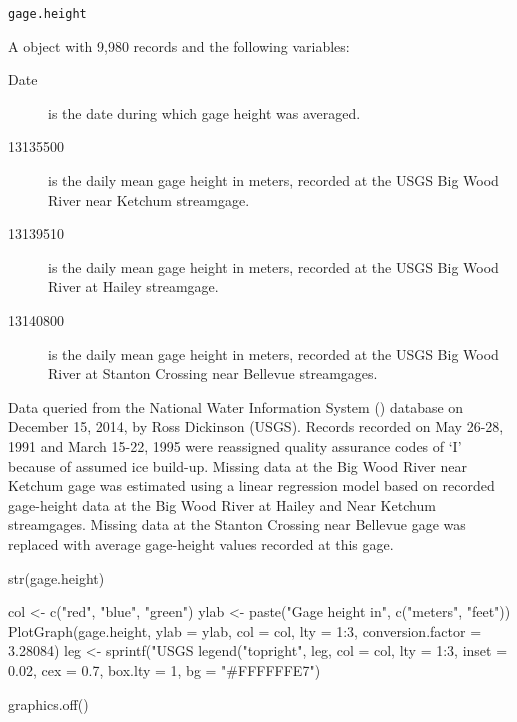 \documentclass[a4paper]{book}
\begin{document}
%
\begin{Usage}
\begin{verbatim}
gage.height
\end{verbatim}
\end{Usage}
%
\begin{Format}
A  object with 9,980 records and the following variables:
\begin{description}

\item[Date] is the date during which gage height was averaged.
\item[13135500] is the daily mean gage height in meters, recorded at the USGS  Big Wood River near Ketchum streamgage.
\item[13139510] is the daily mean gage height in meters, recorded at the USGS  Big Wood River at Hailey streamgage.
\item[13140800] is the daily mean gage height in meters, recorded at the USGS  Big Wood River at Stanton Crossing near Bellevue streamgages.

\end{description}

\end{Format}
%
\begin{Source}\relax
Data queried from the National Water Information System () database on December 15, 2014, by Ross Dickinson (USGS).
Records recorded on May 26-28, 1991 and March 15-22, 1995 were reassigned quality assurance codes of `I' because of assumed ice build-up.
Missing data at the Big Wood River near Ketchum gage was estimated using a linear regression model based on recorded gage-height data at the Big Wood River at Hailey and Near Ketchum streamgages.
Missing data at the Stanton Crossing near Bellevue gage was replaced with average gage-height values recorded at this gage.
\end{Source}
%
\begin{Examples}
\begin{ExampleCode}
str(gage.height)

col <- c("red", "blue", "green")
ylab <- paste("Gage height in", c("meters", "feet"))
PlotGraph(gage.height, ylab = ylab, col = col, lty = 1:3, conversion.factor = 3.28084)
leg <- sprintf("USGS %
legend("topright", leg, col = col, lty = 1:3, inset = 0.02, cex = 0.7,
       box.lty = 1, bg = "#FFFFFFE7")

graphics.off()
\end{ExampleCode}
\end{Examples}
\end{document}
